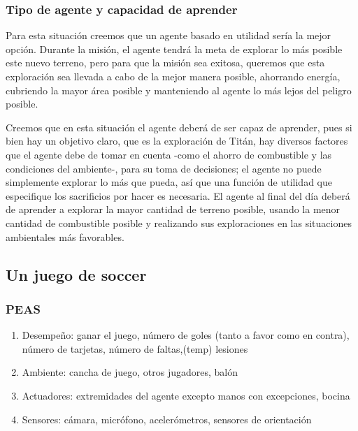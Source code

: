 \documentclass{article}
\begin{document}
            \subsubsection{Tipo de agente y capacidad de aprender}
                Para esta situación creemos que un agente basado en utilidad sería la mejor opción. Durante la misión, el agente tendrá la meta de explorar lo más posible este nuevo terreno, pero para que la misión sea exitosa, queremos que esta exploración sea llevada a cabo de la mejor manera posible, ahorrando energía, cubriendo la mayor área posible y manteniendo al agente lo más lejos del peligro posible.

                Creemos que en esta situación el agente deberá de ser capaz de aprender, pues si bien hay un objetivo claro, que es la exploración de Titán, hay diversos factores que el agente debe de tomar en cuenta -como el ahorro de combustible y las condiciones del ambiente-, para su toma de decisiones; el agente no puede simplemente explorar lo más que pueda, así que una función de utilidad que especifique los sacrificios por hacer es necesaria. El agente al final del día deberá de aprender a explorar la mayor cantidad de terreno posible, usando la menor cantidad de combustible posible y realizando sus exploraciones en las situaciones ambientales más favorables.

        \subsection{Un juego de soccer}
            \subsubsection{PEAS}
                \begin{enumerate}
                    \item Desempeño: ganar el juego, número de goles (tanto a favor como en contra), número de tarjetas, número de faltas,(temp) lesiones
                    \item Ambiente: cancha de juego, otros jugadores, balón
                    \item Actuadores: extremidades del agente excepto manos con excepciones, bocina
                    \item Sensores: cámara, micrófono, acelerómetros, sensores de orientación
                \end{enumerate}
\end{document}
